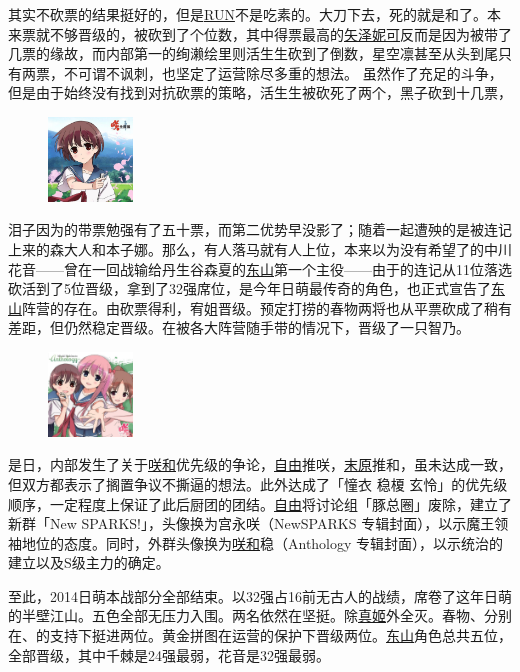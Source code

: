 其实不砍票的结果挺好的，但是\uline{RUN}不是吃素的。大刀下去，死的就是和了。本来票就不够晋级的，被砍到了个位数，其中得票最高的\uline{矢泽妮可}反而是因为被带了几票的缘故，而内部第一的绚濑绘里则活生生砍到了倒数，星空凛甚至从头到尾只有两票，不可谓不讽刺，也坚定了运营除尽多重的想法。
虽然作了充足的斗争，但是由于始终没有找到对抗砍票的策略，活生生被砍死了两个，黑子砍到十几票，\begin{figure}
\includegraphics[width=0.2\textwidth]{images/NewSPARKS.jpg}
\end{figure}泪子因为的带票勉强有了五十票，而第二优势早没影了；随着一起遭殃的是被连记上来的森大人和本子娜。那么，有人落马就有人上位，本来以为没有希望了的中川花音——曾在一回战输给丹生谷森夏的\uline{东山}第一个主役——由于的连记从11位落选砍活到了5位晋级，拿到了32强席位，是今年日萌最传奇的角色，也正式宣告了\uline{东山}阵营的存在。由砍票得利，宥姐晋级。预定打捞的春物两将也从平票砍成了稍有差距，但仍然稳定晋级。在被各大阵营随手带的情况下，晋级了一只智乃。

\begin{figure}
  \includegraphics[width=0.2\textwidth]{images/Anthology.jpg}
\end{figure}

是日，内部发生了关于\uline{咲}\uline{和}优先级的争论，\uline{自由}推咲，\uline{末原}推和，虽未达成一致，但双方都表示了搁置争议不撕逼的想法。此外达成了「憧衣 稳榎 玄怜」的优先级顺序，一定程度上保证了此后厨团的团结。\uline{自由}将讨论组「豚总圈」废除，建立了新群「New SPARKS!」，头像换为宫永咲（NewSPARKS 专辑封面），以示魔王领袖地位的态度。同时，外群头像换为\uline{咲}\uline{和}稳（Anthology 专辑封面），以示统治的建立以及S级主力的确定。

至此，2014日萌本战部分全部结束。以32强占16前无古人的战绩，席卷了这年日萌的半壁江山。五色全部无压力入围。两名依然在坚挺。除\uline{真姬}外全灭。春物、分别在、的支持下挺进两位。黄金拼图在运营的保护下晋级两位。\uline{东山}角色总共五位，全部晋级，其中千棘是24强最弱，花音是32强最弱。

